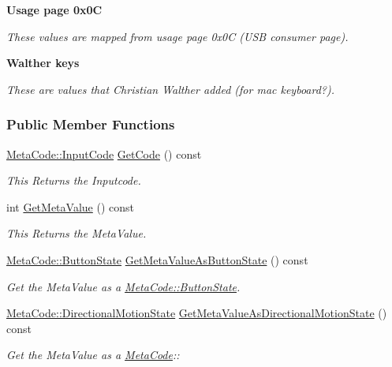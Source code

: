 \begin{Indent}{\bf Usage page 0x0C}\par
{\em These values are mapped from usage page 0x0C (USB consumer page). }\end{Indent}
\begin{Indent}{\bf Walther keys}\par
{\em These are values that Christian Walther added (for mac keyboard?). }\end{Indent}
\subsubsection*{Public Member Functions}
\begin{DoxyCompactItemize}
\item 
\hyperlink{classphys_1_1MetaCode_a3e501cbb5bf0f6f1fdb7211465bda8d8}{MetaCode::InputCode} \hyperlink{classphys_1_1MetaCode_a5835a05391cbb5a3dc83534a7bcf87d3}{GetCode} () const 
\begin{DoxyCompactList}\small\item\em This Returns the Inputcode. \item\end{DoxyCompactList}\item 
int \hyperlink{classphys_1_1MetaCode_ad8e7e4e7c6cdc6a05b8522910ce90cd4}{GetMetaValue} () const 
\begin{DoxyCompactList}\small\item\em This Returns the MetaValue. \item\end{DoxyCompactList}\item 
\hyperlink{classphys_1_1MetaCode_a2fdfb26b3e50ceb0ccc60bfc4c3d6ac2}{MetaCode::ButtonState} \hyperlink{classphys_1_1MetaCode_a4f8da25e905ac23d935e343ec6d7e695}{GetMetaValueAsButtonState} () const 
\begin{DoxyCompactList}\small\item\em Get the MetaValue as a \hyperlink{classphys_1_1MetaCode_a2fdfb26b3e50ceb0ccc60bfc4c3d6ac2}{MetaCode::ButtonState}. \item\end{DoxyCompactList}\item 
\hyperlink{classphys_1_1MetaCode_ad6ed6266b5f4219a6f5da29ebe018757}{MetaCode::DirectionalMotionState} \hyperlink{classphys_1_1MetaCode_a461d2c8c077838889ef33ef54284f7e1}{GetMetaValueAsDirectionalMotionState} () const 
\begin{DoxyCompactList}\small\item\em Get the MetaValue as a \hyperlink{classphys_1_1MetaCode}{MetaCode}:: \item\end{DoxyCompactList}\item 

\end{DoxyCompactItemize}
